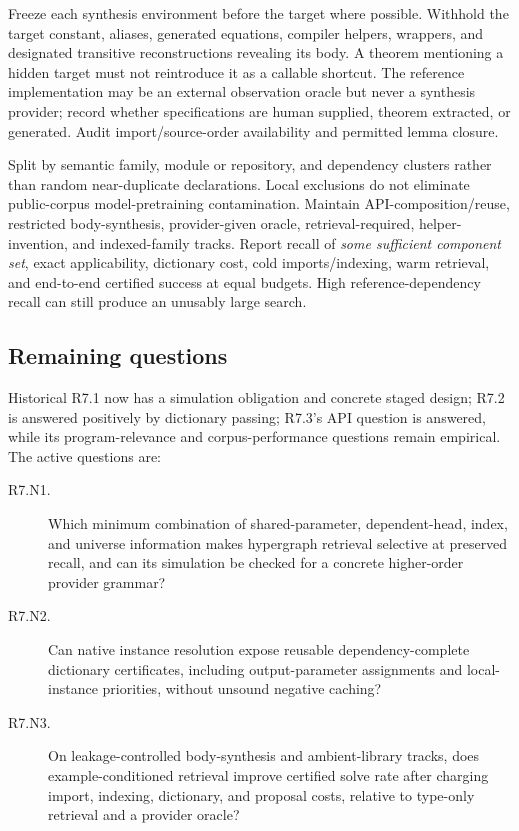 Freeze each synthesis environment before the target where possible. Withhold the target constant, aliases, generated equations, compiler helpers, wrappers, and designated transitive reconstructions revealing its body. A theorem mentioning a hidden target must not reintroduce it as a callable shortcut. The reference implementation may be an external observation oracle but never a synthesis provider; record whether specifications are human supplied, theorem extracted, or generated. Audit import/source-order availability and permitted lemma closure.

Split by semantic family, module or repository, and dependency clusters rather than random near-duplicate declarations. Local exclusions do not eliminate public-corpus model-pretraining contamination. Maintain API-composition/reuse, restricted body-synthesis, provider-given oracle, retrieval-required, helper-invention, and indexed-family tracks. Report recall of \emph{some sufficient component set}, exact applicability, dictionary cost, cold imports/indexing, warm retrieval, and end-to-end certified success at equal budgets. High reference-dependency recall can still produce an unusably large search.

\subsection{Remaining questions}\label{sec:retrieval-open}

Historical R7.1 now has a simulation obligation and concrete staged design; R7.2 is answered positively by dictionary passing; R7.3's API question is answered, while its program-relevance and corpus-performance questions remain empirical. The active questions are:
\begin{description}
\item[R7.N1.] Which minimum combination of shared-parameter, dependent-head, index, and universe information makes hypergraph retrieval selective at preserved recall, and can its simulation be checked for a concrete higher-order provider grammar?
\item[R7.N2.] Can native instance resolution expose reusable dependency-complete dictionary certificates, including output-parameter assignments and local-instance priorities, without unsound negative caching?
\item[R7.N3.] On leakage-controlled body-synthesis and ambient-library tracks, does example-conditioned retrieval improve certified solve rate after charging import, indexing, dictionary, and proposal costs, relative to type-only retrieval and a provider oracle?
\end{description}

